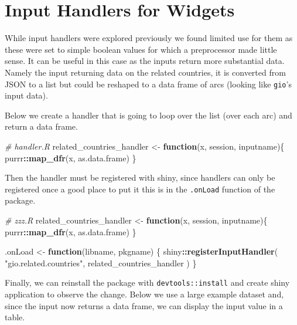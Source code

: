 \documentclass[
]{krantz}
\makeatletter
\newenvironment{Shaded}{\begin{snugshade}}{\end{snugshade}}
\newcommand{\CommentTok}[1]{\textcolor[rgb]{0.37,0.37,0.37}{\textit{#1}}}
\newcommand{\ControlFlowTok}[1]{\textcolor[rgb]{0.27,0.27,0.27}{\textbf{#1}}}
\newcommand{\KeywordTok}[1]{\textcolor[rgb]{0.27,0.27,0.27}{\textbf{#1}}}
\newcommand{\NormalTok}[1]{#1}
\newcommand{\OperatorTok}[1]{\textcolor[rgb]{0.43,0.43,0.43}{\textbf{#1}}}
\newcommand{\StringTok}[1]{\textcolor[rgb]{0.5,0.5,0.5}{#1}}
\newenvironment{kframe}{%
\medskip{}
\setlength{\fboxsep}{.8em}
 \def\at@end@of@kframe{}%
 \ifinner\ifhmode%
  \def\at@end@of@kframe{\end{minipage}}%
  \begin{minipage}{\columnwidth}%
 \fi\fi%
 \def\FrameCommand##1{\hskip\@totalleftmargin \hskip-\fboxsep
 \colorbox{shadecolor}{##1}\hskip-\fboxsep
     \hskip-\linewidth \hskip-\@totalleftmargin \hskip\columnwidth}%
 \MakeFramed {\advance\hsize-\width
   \@totalleftmargin\z@ \linewidth\hsize
   \@setminipage}}%
 {\par\unskip\endMakeFramed%
 \at@end@of@kframe}
\renewenvironment{Shaded}{\begin{kframe}}{\end{kframe}}
\makeatother
\begin{document}
\hypertarget{shiny-widgets-handlers}{%
\section{Input Handlers for Widgets}\label{shiny-widgets-handlers}}

While input handlers were explored previously we found limited use for them as these were set to simple boolean values for which a preprocessor made little sense. It can be useful in this case as the inputs return more substantial data. Namely the input returning data on the related countries, it is converted from JSON to a list but could be reshaped to a data frame of arcs (looking like \texttt{gio}'s input data).

Below we create a handler that is going to loop over the list (over each arc) and return a data frame.

\begin{Shaded}
\begin{Highlighting}[]
\CommentTok{\# handler.R}
\NormalTok{related\_countries\_handler \textless{}{-}}\StringTok{ }\ControlFlowTok{function}\NormalTok{(x, session, inputname)\{}
\NormalTok{  purrr}\OperatorTok{::}\KeywordTok{map\_dfr}\NormalTok{(x, as.data.frame)}
\NormalTok{\}}
\end{Highlighting}
\end{Shaded}

Then the handler must be registered with shiny, since handlers can only be registered once a good place to put it this is in the \texttt{.onLoad} function of the package.

\begin{Shaded}
\begin{Highlighting}[]
\CommentTok{\# zzz.R}
\NormalTok{related\_countries\_handler \textless{}{-}}\StringTok{ }\ControlFlowTok{function}\NormalTok{(x, session, inputname)\{}
\NormalTok{  purrr}\OperatorTok{::}\KeywordTok{map\_dfr}\NormalTok{(x, as.data.frame)}
\NormalTok{\}}

\NormalTok{.onLoad \textless{}{-}}\StringTok{ }\ControlFlowTok{function}\NormalTok{(libname, pkgname) \{}
\NormalTok{  shiny}\OperatorTok{::}\KeywordTok{registerInputHandler}\NormalTok{(}
    \StringTok{"gio.related.countries"}\NormalTok{, }
\NormalTok{    related\_countries\_handler}
\NormalTok{  )}
\NormalTok{\}}
\end{Highlighting}
\end{Shaded}

Finally, we can reinstall the package with \texttt{devtools::install} and create shiny application to observe the change. Below we use a large example dataset and, since the input now returns a data frame, we can display the input value in a table.
\end{document}

